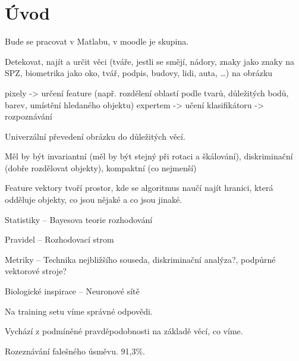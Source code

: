 \documentclass[12pt]{article}					%
\begin{document}
\section{Úvod}
    Bude se pracovat v Matlabu, v moodle je skupina.


    \begin{poznamka}
        Detekovat, najít a určit věci (tváře, jestli se smějí, nádory, znaky jako znaky na SPZ, biometrika jako oko, tvář, podpis, budovy, lidi, auta, …) na obrázku
    \end{poznamka}

    \begin{poznamka}
        pixely -> určení feature (např. rozdělení oblastí podle tvarů, důležitých bodů, barev, umístění hledaného objektu) expertem -> učení klasifikátoru -> rozpoznávání
    \end{poznamka}
    
    \begin{definice}
        Univerzální převedení obrázku do důležitých věcí.    

        Měl by být invariantní (měl by být stejný při rotaci a škálování), diskriminační (dobře rozdělovat objekty), kompaktní (co nejmenší)
    \end{definice}

    \begin{definice}[Rozpoznávání]
        Feature vektory tvoří prostor, kde se algoritmus naučí najít hranici, která odděluje objekty, co jsou nějaké a co jsou jinaké.
    \end{definice}

    \begin{poznamka}
        Statistiky -- Bayesova teorie rozhodování

        Pravidel -- Rozhodovací strom

        Metriky -- Technika nejbližšího souseda, diskriminační analýza?, podpůrné vektorové stroje?

        Biologické inspirace -- Neuronové sítě
    \end{poznamka}

    \begin{definice}
        Na training setu víme správné odpovědi.
    \end{definice}

    \begin{definice}
        Vychází z podmíněné pravděpodobnosti na základě věcí, co víme.
        \begin{prikladyin}
            Rozeznávání falešného úsměvu. 91,3\%.
        \end{prikladyin}
    \end{definice}
\end{document}

